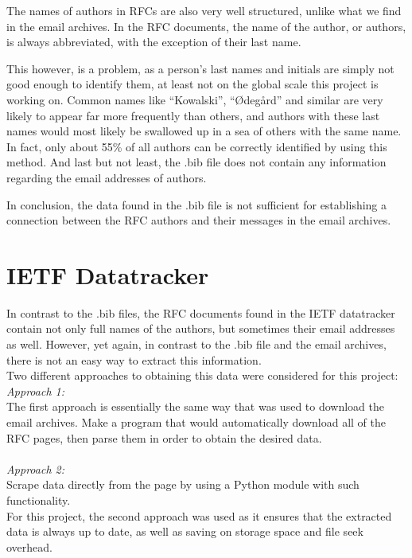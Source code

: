 \documentclass[a4paper,english]{report}
\begin{document}
The names of authors in RFCs are also very well structured, unlike what we find in the email archives. In the RFC documents, the name of the author, or authors, is always abbreviated, with the exception of their last name.

This however, is a problem, as a person's last names and initials are simply not good enough to identify them, at least not on the global scale this project is working on. Common names like “Kowalski”, “Ødegård” and similar are very likely to appear far more frequently than others, and authors with these last names would most likely be swallowed up in a sea of others with the same name. In fact, only about 55\% of all authors can be correctly identified by using this method. And last but not least, the .bib file does not contain any information regarding the email addresses of authors.

In conclusion, the data found in the .bib file is not sufficient for establishing a connection between the RFC authors and their messages in the email archives.

\section{IETF Datatracker}



In contrast to the .bib files, the RFC documents found in the IETF datatracker contain not only full names of the authors, but sometimes their email addresses as well. However, yet again, in contrast to the .bib file and the email archives, there is not an easy way to extract this information.\\

Two different approaches to obtaining this data were considered for this project:\\


\emph{Approach 1:}\\
The first approach is essentially the same way that was used to download the email archives. Make a program that would automatically download all of the RFC pages, then parse them in order to obtain the desired data.\\\\

\emph{Approach 2:} \\
Scrape data directly from the page by using a Python module with such functionality.\\

For this project, the second approach was used as it ensures that the extracted data is always up to date, as well as saving on storage space and file seek overhead. 
\end{document}
